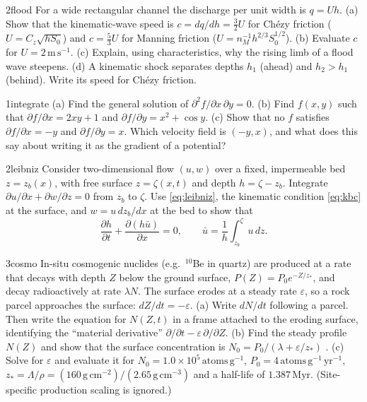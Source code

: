 \documentclass[11pt,letterpaper]{article}
\numberwithin{equation}{section}
\newcommand{\pd}[2]{\frac{\partial #1}{\partial #2}}
\newcommand{\units}[1]{\,\mathrm{#1}}
\begin{document}
\begin{exercise}{2}{flood}
For a wide rectangular channel the discharge per unit width is $q=Uh$.
(a) Show that the kinematic-wave speed is $c=dq/dh=\tfrac32U$ for Ch\'ezy friction ($U=C_z\sqrt{hS_0}$) and
$c=\tfrac53U$ for Manning friction ($U=n_M^{-1}h^{2/3}S_0^{1/2}$).
(b) Evaluate $c$ for $U=2\units{m\,s^{-1}}$.
(c) Explain, using characteristics, why the rising limb of a flood wave steepens.
(d) A kinematic shock separates depths $h_1$ (ahead) and $h_2>h_1$ (behind). Write its speed for Ch\'ezy friction.
\end{exercise}

\begin{exercise}{1}{integrate}
(a) Find the general solution of $\partial^2 f/\partial x\,\partial y=0$.
(b) Find $f(x,y)$ such that $\partial f/\partial x=2xy+1$ and $\partial f/\partial y=x^2+\cos y$.
(c) Show that no $f$ satisfies $\partial f/\partial x=-y$ and $\partial f/\partial y=x$. Which velocity field is
$(-y,x)$, and what does this say about writing it as the gradient of a potential?
\end{exercise}

\begin{exercise}{2}{leibniz}
Consider two-dimensional flow $(u,w)$ over a fixed, impermeable bed $z=z_b(x)$, with free surface $z=\zeta(x,t)$ and
depth $h=\zeta-z_b$. Integrate $\partial u/\partial x+\partial w/\partial z=0$ from $z_b$ to $\zeta$. Use
\eqref{eq:leibniz}, the kinematic condition \eqref{eq:kbc} at the surface, and $w=u\,dz_b/dx$ at the bed to show that
\[
\pd{h}{t}+\pd{(h\bar u)}{x}=0,\qquad \bar u=\frac1h\int_{z_b}^{\zeta}u\,dz .
\]
\end{exercise}

\begin{exercise}{3}{cosmo}
In-situ cosmogenic nuclides (e.g.\ $^{10}$Be in quartz) are produced at a rate that decays with depth $Z$ below
the ground surface, $P(Z)=P_0e^{-Z/z_*}$, and decay radioactively at rate $\lambda N$. The surface erodes at a
steady rate $\varepsilon$, so a rock parcel approaches the surface: $dZ/dt=-\varepsilon$.
(a) Write $dN/dt$ following a parcel. Then write the equation for $N(Z,t)$ in a frame attached to the eroding
surface, identifying the ``material derivative'' $\partial/\partial t-\varepsilon\,\partial/\partial Z$.
(b) Find the steady profile $N(Z)$ and show that the surface concentration is $N_0=P_0/(\lambda+\varepsilon/z_*)$
\citep{lal1991}.
(c) Solve for $\varepsilon$ and evaluate it for $N_0=1.0\times10^5\units{atoms\,g^{-1}}$,
$P_0=4\units{atoms\,g^{-1}\,yr^{-1}}$, $z_*=\Lambda/\rho=(160\units{g\,cm^{-2}})/(2.65\units{g\,cm^{-3}})$ and a
half-life of $1.387\units{Myr}$. (Site-specific production scaling is ignored.)
\end{exercise}
\end{document}
